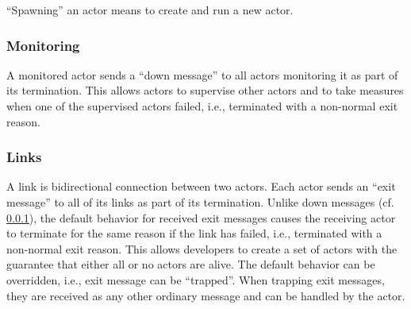 ``Spawning'' an actor means to create and run a new actor.

\subsubsection{Monitoring}
\label{sec:monitoring}

A monitored actor sends a ``down message'' to all actors monitoring it as part of its termination.
This allows actors to supervise other actors and to take measures when one of the supervised actors failed, i.e., terminated with a non-normal exit reason.

\subsubsection{Links}

A link is bidirectional connection between two actors.
Each actor sends an ``exit message'' to all of its links as part of its termination.
Unlike down messages (cf. \ref{sec:monitoring}), the default behavior for received exit messages causes the receiving actor to terminate for the same reason if the link has failed, i.e., terminated with a non-normal exit reason.
This allows developers to create a set of actors with the guarantee that either all or no actors are alive.
The default behavior can be overridden, i.e., exit message can be ``trapped''.
When trapping exit messages, they are received as any other ordinary message and can be handled by the actor.
